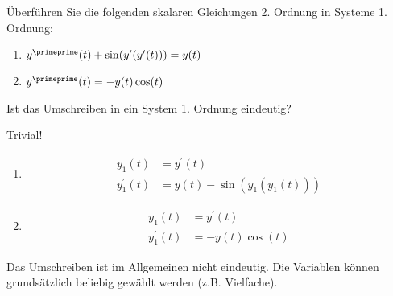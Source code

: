 \begin{exercise}

Überführen Sie die folgenden skalaren Gleichungen 2. Ordnung in Systeme 1. Ordnung:

\begin{enumerate}[label = \textbf{\alph*)}]

  \item $y^\primeprime(t) + \sin(y^\prime(y^\prime(t))) = y(t)$

  \item $y^\primeprime(t) = -y(t) \cos(t)$

\end{enumerate}

Ist das Umschreiben in ein System 1. Ordnung eindeutig?

\end{exercise}

\begin{solution}

Trivial!

\begin{enumerate}[label = \textbf{\alph*)}]

  \item
  \begin{align*}
    y_1(t) & = y^\prime(t) \\
    y_1^\prime(t) & = y(t) - \sin(y_1(y_1(t)))
  \end{align*}

  \item
  \begin{align*}
    y_1(t) & = y^\prime(t) \\
    y_1^\prime(t) & = -y(t)\cos(t)
  \end{align*}

\end{enumerate}

Das Umschreiben ist im Allgemeinen nicht eindeutig.
Die Variablen können grundsätzlich beliebig gewählt werden (z.B. Vielfache).

\end{solution}

